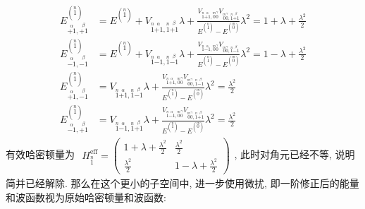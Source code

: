     \begin{align*}
        E^{(\stackrel{n}{1})}_{\stackrel{\alpha}{+1},\stackrel{\beta}{+1}} &= 
        E^{(\stackrel{n}{1})} 
        + V_{\stackrel{n}{1}\stackrel{\alpha}{+1},\stackrel{n}{1}\stackrel{\beta}{+1}}\lambda 
        + \frac{V_{\stackrel{n}{1}\stackrel{\alpha}{+1},\stackrel{m}{0}\stackrel{\gamma}{0}}V_{\stackrel{m}{0}\stackrel{\gamma}{0},\stackrel{n}{1}\stackrel{\beta}{+1}}}{E^{(\stackrel{n}{1})} - E^{(\stackrel{m}{0})}}\lambda^{2} = 1 + \lambda + \frac{\lambda^{2}}{2}\\
        E^{(\stackrel{n}{1})}_{\stackrel{\alpha}{-1},\stackrel{\beta}{-1}} &= 
        E^{(\stackrel{n}{1})}
        + V_{\stackrel{n}{1}\stackrel{\alpha}{-1},\stackrel{n}{1}\stackrel{\beta}{-1}}\lambda
        + \frac{V_{\stackrel{n}{1}\stackrel{\alpha}{-1},\stackrel{m}{0}\stackrel{\gamma}{0}}V_{\stackrel{m}{0}\stackrel{\gamma}{0},\stackrel{n}{1}\stackrel{\beta}{-1}}}{E^{(\stackrel{n}{1})} - E^{(\stackrel{m}{0})}}\lambda^{2} = 1 - \lambda + \frac{\lambda^{2}}{2}\\
        E^{(\stackrel{n}{1})}_{\stackrel{\alpha}{+1},\stackrel{\beta}{-1}} &=
        V_{\stackrel{n}{1}\stackrel{\alpha}{+1},\stackrel{n}{1}\stackrel{\beta}{-1}}\lambda + \frac{V_{\stackrel{n}{1}\stackrel{\alpha}{+1},\stackrel{m}{0}\stackrel{\gamma}{0}}V_{\stackrel{m}{0}\stackrel{\gamma}{0},\stackrel{n}{1}\stackrel{\beta}{-1}}}{E^{(\stackrel{n}{1})} - E^{(\stackrel{m}{0})}}\lambda^{2} =  \frac{\lambda^{2}}{2}\\
        E^{(\stackrel{n}{1})}_{\stackrel{\alpha}{-1},\stackrel{\beta}{+1}} &=
        V_{\stackrel{n}{1}\stackrel{\alpha}{-1},\stackrel{n}{1}\stackrel{\beta}{+1}}\lambda + \frac{V_{\stackrel{n}{1}\stackrel{\alpha}{-1},\stackrel{m}{0}\stackrel{\gamma}{0}}V_{\stackrel{m}{0}\stackrel{\gamma}{0},\stackrel{n}{1}\stackrel{\beta}{+1}}}{E^{(\stackrel{n}{1})} - E^{(\stackrel{m}{0})}}\lambda^{2} =  \frac{\lambda^{2}}{2}
    \end{align*}
    有效哈密顿量为 $\begin{aligned}
        H_{\stackrel{n}{1}}^{\text{eff}} = \begin{pmatrix}
            1 + \lambda + \frac{\lambda^{2}}{2} & \frac{\lambda^{2}}{2}\\
            \frac{\lambda^{2}}{2} & 1 - \lambda + \frac{\lambda^{2}}{2}
        \end{pmatrix}
    \end{aligned}$, 此时对角元已经不等, 说明简并已经解除. 那么在这个更小的子空间中, 进一步使用微扰, 即一阶修正后的能量和波函数视为原始哈密顿量和波函数:
